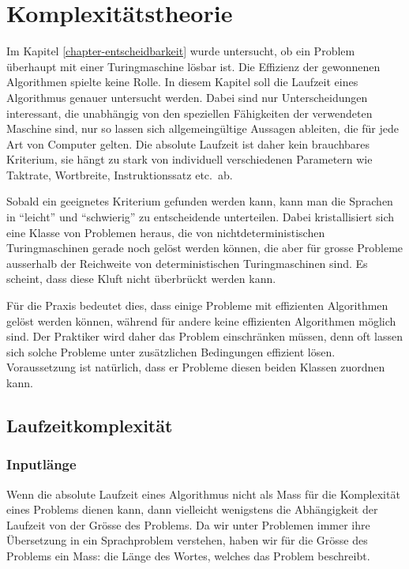 %
%
%
\chapter{Komplexitätstheorie\label{chapter-komplexitaet}}
\rhead{}
Im Kapitel \ref{chapter-entscheidbarkeit} wurde untersucht, ob ein
Problem überhaupt mit einer Turingmaschine lösbar ist. Die
Effizienz der gewonnenen Algorithmen spielte keine Rolle.
In diesem Kapitel soll die Laufzeit eines Algorithmus genauer
untersucht werden. Dabei sind nur Unterscheidungen interessant,
die unabhängig von den speziellen Fähigkeiten der verwendeten
Maschine sind, nur so lassen sich allgemeingültige Aussagen
ableiten, die für jede Art von Computer gelten. Die absolute Laufzeit
ist daher kein brauchbares Kriterium, sie hängt zu stark
von individuell verschiedenen Parametern wie Taktrate, Wortbreite,
Instruktionssatz etc.~ab. 

Sobald ein geeignetes Kriterium gefunden werden kann, kann man
die Sprachen in ``leicht'' und ``schwierig'' zu entscheidende 
unterteilen. Dabei kristallisiert sich eine Klasse von
Problemen heraus, die von nichtdeterministischen Turingmaschinen
gerade noch gelöst werden können, die aber für grosse
Probleme ausserhalb der Reichweite von deterministischen Turingmaschinen
sind. Es scheint, dass diese Kluft nicht überbrückt werden kann.

Für die Praxis bedeutet dies, dass einige Probleme mit effizienten
Algorithmen gelöst werden können, während für andere 
keine effizienten Algorithmen möglich sind. Der Praktiker wird daher
das Problem einschränken müssen, denn oft lassen sich solche
Probleme unter zusätzlichen Bedingungen effizient lösen.
Voraussetzung ist natürlich, dass er Probleme diesen beiden
Klassen zuordnen kann.

\section{Laufzeitkomplexität}
\subsection{Inputlänge}
Wenn die absolute Laufzeit eines Algorithmus nicht als Mass für
die Komplexität eines Problems dienen kann, dann vielleicht
wenigstens die Abhängigkeit der Laufzeit von der Grösse des
Problems. Da wir unter Problemen immer ihre Übersetzung in ein
Sprachproblem verstehen, haben wir für die Grösse des Problems
ein Mass: die Länge des Wortes, welches das Problem beschreibt.

